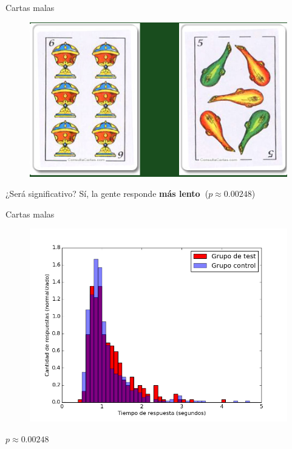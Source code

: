 \documentclass{beamer}
\begin{document}
\begin{frame}{Cartas malas}
\begin{figure}
   \includegraphics[width=0.8\linewidth]{examples_img/rondas_4.png}
\end{figure}
\begin{center}¿Será significativo?
\pause
Sí, la gente responde \textbf{más lento\ }($p \approx 0.00248$)
\end{center}
\end{frame}

\begin{frame}{Cartas malas}
\begin{figure}
   \includegraphics[width=0.9\linewidth]{graficos/rondas4vs5.png}
\end{figure}
\begin{center}$p \approx 0.00248$
\end{center}
\end{frame}
\end{document}
